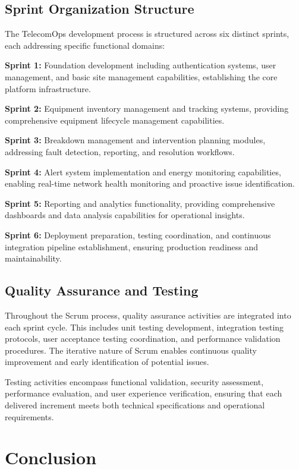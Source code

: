 \subsection{Sprint Organization Structure}

The TelecomOps development process is structured across six distinct sprints, each addressing specific functional domains:

\textbf{Sprint 1:} Foundation development including authentication systems, user management, and basic site management capabilities, establishing the core platform infrastructure.

\textbf{Sprint 2:} Equipment inventory management and tracking systems, providing comprehensive equipment lifecycle management capabilities.

\textbf{Sprint 3:} Breakdown management and intervention planning modules, addressing fault detection, reporting, and resolution workflows.

\textbf{Sprint 4:} Alert system implementation and energy monitoring capabilities, enabling real-time network health monitoring and proactive issue identification.

\textbf{Sprint 5:} Reporting and analytics functionality, providing comprehensive dashboards and data analysis capabilities for operational insights.

\textbf{Sprint 6:} Deployment preparation, testing coordination, and continuous integration pipeline establishment, ensuring production readiness and maintainability.

\subsection{Quality Assurance and Testing}

Throughout the Scrum process, quality assurance activities are integrated into each sprint cycle. This includes unit testing development, integration testing protocols, user acceptance testing coordination, and performance validation procedures. The iterative nature of Scrum enables continuous quality improvement and early identification of potential issues.

Testing activities encompass functional validation, security assessment, performance evaluation, and user experience verification, ensuring that each delivered increment meets both technical specifications and operational requirements.

\section*{Conclusion}

